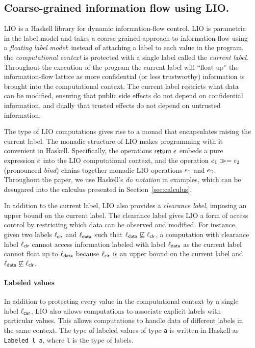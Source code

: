 \subsection{Coarse-grained information flow using LIO.}
LIO \cite{SRMMlio} is a Haskell library for dynamic information-flow control. LIO is parametric in the label model and takes a coarse-grained approach to information-flow using a \emph{floating label model}: instead of attaching a label to each value in the program, the \emph{computational context} is protected with a single label called the \emph{current label}. Throughout the execution of the program the current label will ``float up'' the information-flow lattice as more confidential (or less trustworthy) information is brought into the computational context. The current label restricts what data can be modified, ensuring that public side effects do not depend on confidential information, and dually that trusted effects do not depend on untrusted information.

The type of LIO computations gives rise to a monad \cite{Wadler:1995:MFP:647698.734146} that encapsulates raising the current label. The monadic structure of LIO makes programming with it convenient in Haskell. Specifically, the operations $\mathsf{return}\;e$ embeds a pure expression $e$ into the LIO computational context, and the operation $e_1 \gg= e_2$ (pronounced \emph{bind}) chains together monadic LIO operations $e_1$ and $e_2$. Throughout the paper, we use Haskell's \emph{do notation} in examples, which can be desugared into the calculus presented in Section~\ref{sec:calculus}.

In addition to the current label, LIO also provides a \emph{clearance label}, imposing an upper bound on the current label. The clearance label gives LIO a form of access control by restricting which data can be observed and modified. For instance, given two labels $\ell_{\mathsf{clr}}$ and $\ell_{\mathsf{data}}$ such that $\ell_{\mathsf{data}} \not\sqsubseteq \ell_{\mathsf{clr}}$, a computation with clearance label $\ell_{\mathsf{clr}}$ cannot access information labeled with label $\ell_{\mathsf{data}}$ as the current label cannot float up to $\ell_{\mathsf{data}}$ because $\ell_{\mathsf{clr}}$ is an upper bound on the current label and $\ell_{\mathsf{data}} \not\sqsubseteq \ell_{\mathsf{clr}}$.

\paragraph{Labeled values}
In addition to protecting every value in the computational context by a single label $\ell_{\mathsf{cur}}$, LIO also allows computations to associate explicit labels with particular values. This allows computations to handle data of different labels in the same context. The type of labeled values of type \texttt{a} is written in Haskell as \texttt{Labeled l a}, where \texttt{l} is the type of labels.

